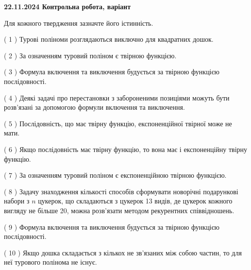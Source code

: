 \documentclass[12pt, ukrainian]{article}
\begin{document}
\vspace{4mm}
\newpage
\begin {large}

\textbf{22.11.2024 Контрольна робота, варіант  }\par


{
Для кожного твердження зазначте його істинність.\par
\vspace{2mm}
( 1 ) Турові поліноми розглядаються виключно для квадратних дошок.%

( 2 ) За означенням туровий поліном є твірною функцією.%

( 3 ) Формула включення та виключення будується за твірною функцією послідовності.%

( 4 ) Деякі задачі про перестановки з забороненими позиціями можуть бути розв’я\-за\-ні за допомогою формули включення та виключення.%

( 5 ) Послідовність, що має твірну функцію, експоненційної твірної може не мати.%

( 6 ) Якщо послідовність має твірну функцію, то вона має і експоненційну твірну функцію.%

( 7 ) За означенням туровий поліном є експоненційною твірною функцією.%

( 8 ) Задачу знаходження кількості способів сформувати новорічні подарункові набори з $n$ цукерок, що складаються з цукерок 13 видів, де цукерок кожного вигляду не більше 20, можна розв’язати методом рекурентних співвідношень.%

( 9 ) Формула включення та виключення будується за твірною функцією послідовності.%

( 10 ) Якщо дошка складається з кількох не зв’язаних між собою частин, то для неї турового полінома не існує.%


\vspace{5mm}
}
\end {large}
\end{document}
